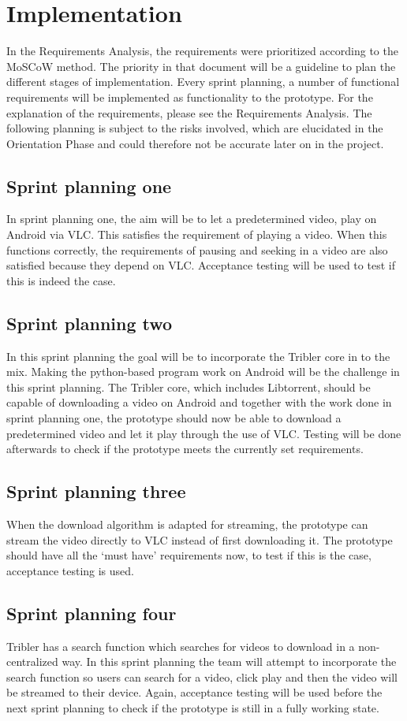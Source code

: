 \chapter{Implementation}
\thispagestyle{fancy}
\label{sec:impl}
In the Requirements Analysis, the requirements were prioritized according to the MoSCoW method. The priority in that document will be a guideline to plan the different stages of implementation. Every sprint planning, a number of functional requirements will be implemented as functionality to the prototype. For the explanation of the requirements, please see the Requirements Analysis. The following planning is subject to the risks involved, which are elucidated in the Orientation Phase and could therefore not be accurate later on in the project.

\section{Sprint planning one}
In sprint planning one, the aim will be to let a predetermined video, play on Android via VLC. This satisfies the requirement of playing a video. When this functions correctly, the requirements of pausing and seeking in a video are also satisfied because they depend on VLC. Acceptance testing will be used to test if this is indeed the case.
\section{Sprint planning two}
In this sprint planning the goal will be to incorporate the Tribler core in to the mix. Making the python-based program work on Android will be the challenge in this sprint planning. The Tribler core, which includes Libtorrent, should be capable of downloading a video on Android and together with the work done in sprint planning one, the prototype should now be able to download a predetermined video and let it play through the use of VLC. Testing will be done afterwards to check if the prototype meets the currently set requirements.
\section{Sprint planning three}
When the download algorithm is adapted for streaming, the prototype can stream the video directly to VLC instead of first downloading it. The prototype should have all the `must have' requirements now, to test if this is the case, acceptance testing is used.
\section{Sprint planning four}
Tribler has a search function which searches for videos to download in a non-centralized way. In this sprint planning the team will attempt to incorporate the search function so users can search for a video, click play and then the video will be streamed to their device. Again, acceptance testing will be used before the next sprint planning to check if the prototype is still in a fully working state.
